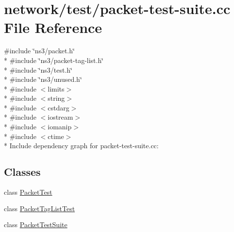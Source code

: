 \hypertarget{packet-test-suite_8cc}{}\section{network/test/packet-\/test-\/suite.cc File Reference}
\label{packet-test-suite_8cc}
{\ttfamily \#include \char`\"{}ns3/packet.\+h\char`\"{}}\\*
{\ttfamily \#include \char`\"{}ns3/packet-\/tag-\/list.\+h\char`\"{}}\\*
{\ttfamily \#include \char`\"{}ns3/test.\+h\char`\"{}}\\*
{\ttfamily \#include \char`\"{}ns3/unused.\+h\char`\"{}}\\*
{\ttfamily \#include $<$limits$>$}\\*
{\ttfamily \#include $<$string$>$}\\*
{\ttfamily \#include $<$cstdarg$>$}\\*
{\ttfamily \#include $<$iostream$>$}\\*
{\ttfamily \#include $<$iomanip$>$}\\*
{\ttfamily \#include $<$ctime$>$}\\*
Include dependency graph for packet-\/test-\/suite.cc\+:
\subsection*{Classes}
\begin{DoxyCompactItemize}
\item 
class \hyperlink{classPacketTest}{Packet\+Test}
\item 
class \hyperlink{classPacketTagListTest}{Packet\+Tag\+List\+Test}
\item 
class \hyperlink{classPacketTestSuite}{Packet\+Test\+Suite}
\end{DoxyCompactItemize}
